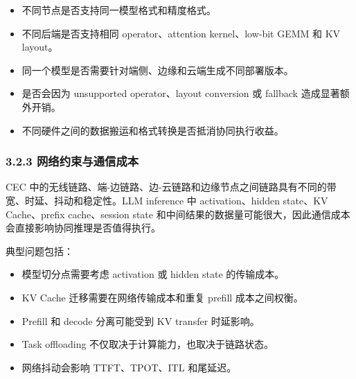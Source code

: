 \documentclass[a4paper,twocolumn,10pt]{ctexart}
\begin{document}
\begin{itemize}
\item 不同节点是否支持同一模型格式和精度格式。

\item 不同后端是否支持相同 operator、attention kernel、low-bit GEMM 和 KV layout。

\item 同一个模型是否需要针对端侧、边缘和云端生成不同部署版本。

\item 是否会因为 unsupported operator、layout conversion 或 fallback 造成显著额外开销。

\item 不同硬件之间的数据搬运和格式转换是否抵消协同执行收益。



\end{itemize}




\subsubsection{3.2.3 网络约束与通信成本}



CEC 中的无线链路、端-边链路、边-云链路和边缘节点之间链路具有不同的带宽、时延、抖动和稳定性。LLM inference 中 activation、hidden state、KV Cache、prefix cache、session state 和中间结果的数据量可能很大，因此通信成本会直接影响协同推理是否值得执行。




典型问题包括：




\begin{itemize}
\item 模型切分点需要考虑 activation 或 hidden state 的传输成本。

\item KV Cache 迁移需要在网络传输成本和重复 prefill 成本之间权衡。

\item Prefill 和 decode 分离可能受到 KV transfer 时延影响。

\item Task offloading 不仅取决于计算能力，也取决于链路状态。

\item 网络抖动会影响 TTFT、TPOT、ITL 和尾延迟。



\end{itemize}
\end{document}
